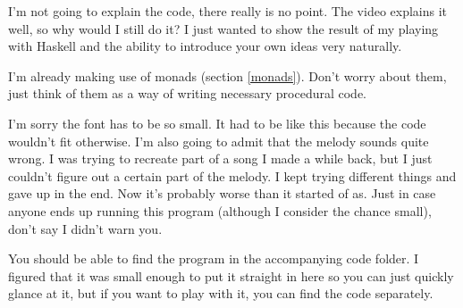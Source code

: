 \documentclass[11pt]{article}
\begin{document}
I'm not going to explain the code, there really is no point. The video explains
it well, so why would I still do it? I just wanted to show the result of my
playing with Haskell and the ability to introduce your own ideas very
naturally.

I'm already making use of monads (section \ref{monads}). Don't worry about
them, just think of them as a way of writing necessary procedural code.

I'm sorry the font has to be so small. It had to be like this because the code
wouldn't fit otherwise. I'm also going to admit that the melody sounds quite
wrong. I was trying to recreate part of a song I made a while back, but I just
couldn't figure out a certain part of the melody. I kept trying different
things and gave up in the end. Now it's probably worse than it started of as.
Just in case anyone ends up running this program (although I consider the
chance small), don't say I didn't warn you.

You should be able to find the program in the accompanying code folder. I
figured that it was small enough to put it straight in here so you can just
quickly glance at it, but if you want to play with it, you can find the code
separately.
\end{document}
